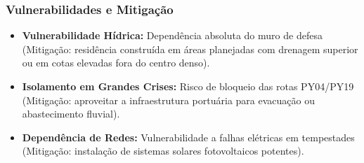 \subsubsection{Vulnerabilidades e
Mitigação}

\begin{itemize}
\tightlist
\item
  \textbf{Vulnerabilidade Hídrica:} Dependência absoluta do muro de
  defesa (Mitigação: residência construída em áreas planejadas com
  drenagem superior ou em cotas elevadas fora do centro denso).
\item
  \textbf{Isolamento em Grandes Crises:} Risco de bloqueio das rotas
  PY04/\allowbreak PY19 (Mitigação: aproveitar a infraestrutura portuária para
  evacuação ou abastecimento fluvial).
\item
  \textbf{Dependência de Redes:} Vulnerabilidade a falhas elétricas em
  tempestades (Mitigação: instalação de sistemas solares fotovoltaicos
  potentes).
\end{itemize}

